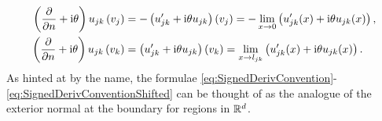 \begin{subequations} \label{eq:SignedDerivConventionShifted}
	\begin{align*}
		\left( \dfrac{\partial }{\partial n}+ \mathrm{i}\theta \right)u_{jk}\left( v_j \right) &= -\left( u_{jk}' + \mathrm{i}\theta u_{jk} \right)\left( v_j \right) = -\lim_{x\rightarrow0} \left(  u_{jk}'(x)+\mathrm{i}\theta u_{jk}(x)  \right), \\
		\left( \dfrac{\partial }{\partial n}+ \mathrm{i}\theta \right)u_{jk}\left( v_k \right) &= \left( u_{jk}' + \mathrm{i}\theta u_{jk} \right)\left( v_k \right) = \lim_{x\rightarrow l_{jk}} \left(  u_{jk}'(x)+\mathrm{i}\theta u_{jk}(x)  \right).
	\end{align*}
\end{subequations}
As hinted at by the name, the formulae \eqref{eq:SignedDerivConvention}-\eqref{eq:SignedDerivConventionShifted} can be thought of as the analogue of the exterior normal at the boundary for regions in $\mathbb{R}^d$.


